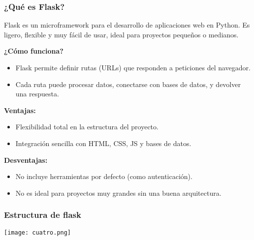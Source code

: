 \documentclass{beamer}
\begin{document}
\begin{frame}
    \frametitle{¿Qué es Flask?}

    Flask es un microframework para el desarrollo de aplicaciones web en Python. Es ligero, flexible y muy fácil de usar, ideal para proyectos pequeños o medianos.

    \vspace{0.5cm}
    \textbf{¿Cómo funciona?}
    \begin{itemize}
        \item Flask permite definir rutas (URLs) que responden a peticiones del navegador.
        \item Cada ruta puede procesar datos, conectarse con bases de datos, y devolver una respuesta.
    \end{itemize}

    \vspace{0.3cm}
    \textbf{Ventajas:}
    \begin{itemize}
        \item Flexibilidad total en la estructura del proyecto.
        \item Integración sencilla con HTML, CSS, JS y bases de datos.
    \end{itemize}

    \vspace{0.3cm}
    \textbf{Desventajas:}
    \begin{itemize}
        \item No incluye herramientas por defecto (como autenticación).
        \item No es ideal para proyectos muy grandes sin una buena arquitectura.
    \end{itemize}
\end{frame}

\begin{frame}
    \frametitle{Estructura de flask}
    \begin{center}
        \texttt{[image: cuatro.png]}
    \end{center}
\end{frame}
\end{document}
